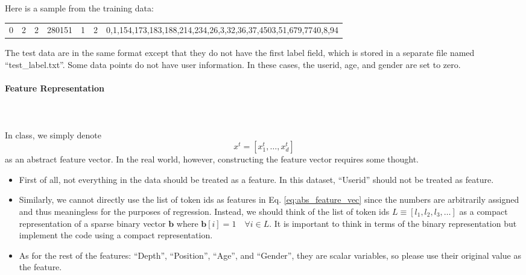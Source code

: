 \documentclass[12pt]{article}
\begin{document}
{Here is a sample from the training data:
\begin{center}
  \begin{tabular}{c|c|c|c|c|c|c}
    0&2&2&280151&1&2&0,1,154,173,183,188,214,234,26,3,32,36,37,4503,51,679,7740,8,94
  \end{tabular}
\end{center}

The test data are in the same format except that they do not have the first label field, which is stored in a separate file named ``test\_label.txt''.
Some data points do not have user information. In these cases, the userid, age, and gender are set to zero. 
\paragraph{Feature Representation} ~\\
\\In class, we simply denote 
\begin{equation}
x^t = [x_1^t, \dots, x_d^t]
\label{eq:abs_feature_vec}
\end{equation}
as an abstract feature vector. In the real world, however, constructing the feature vector requires some thought.  
\begin{itemize}
  \item  First of all, not everything in the data should be treated as a feature. In this dataset, ``Userid'' should not be treated as feature.  
  \item  Similarly, we cannot directly use the list of token ids as features in Eq. \ref{eq:abs_feature_vec} since the numbers are arbitrarily assigned and thus meaningless for the purposes of regression. Instead, we should think of the list of token ids 
          $L \equiv [l_1, l_2, l_3,\dots]$ as a compact representation of a sparse binary vector $\mathbf{b}$ where $\mathbf{b}[i] = 1  \quad \forall i \in L$.
         It is important to think in terms of the binary representation but implement the code using a compact representation. 
  \item  As for the rest of the features: ``Depth'', ``Position'', ``Age'', and ``Gender'', they are scalar variables, so please use their original value as the feature.
\end{itemize}
}
\end{document}
